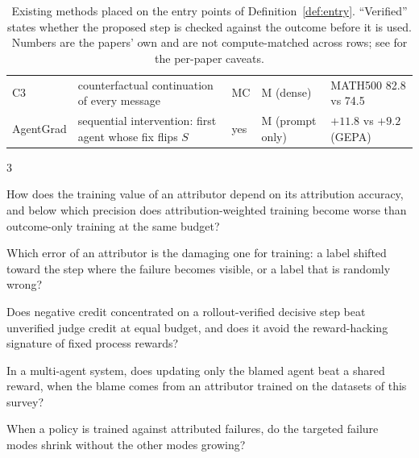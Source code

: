 \begin{table}[h]
\begin{tabularx}{\linewidth}{@{}l >{\RaggedRight\hsize=1.05\hsize}X l >{\RaggedRight\hsize=0.95\hsize}X l@{}}
C3 \cite{chen2026c3} & counterfactual continuation of every message & MC & M (dense) & MATH500 82.8 vs 74.5 \\
AgentGrad \cite{chu2026agentgrad} & sequential intervention: first agent whose fix flips $S$ & yes & M (prompt only) & $+11.8$ vs $+9.2$ (GEPA) \\\bottomrule
\end{tabularx}
\caption{Existing methods placed on the entry points of Definition~\ref{def:entry}. ``Verified'' states whether the proposed step is checked against the outcome before it is used. Numbers are the papers' own and are not compute-matched across rows; see  for the per-paper caveats.}
\label{tab:entry}
\end{table}

\begin{rqbox}{3}
\begin{description}[leftmargin=3.2em,style=sameline,font=\bfseries,itemsep=1.5pt]
\item[RQ\,3.1] How does the training value of an attributor depend on its attribution accuracy, and below which precision does attribution-weighted training become worse than outcome-only training at the same budget?
\item[RQ\,3.2] Which error of an attributor is the damaging one for training: a label shifted toward the step where the failure becomes visible, or a label that is randomly wrong?
\item[RQ\,3.3] Does negative credit concentrated on a rollout-verified decisive step beat unverified judge credit at equal budget, and does it avoid the reward-hacking signature of fixed process rewards?
\item[RQ\,3.4] In a multi-agent system, does updating only the blamed agent beat a shared reward, when the blame comes from an attributor trained on the datasets of this survey?
\item[RQ\,3.5] When a policy is trained against attributed failures, do the targeted failure modes shrink without the other modes growing?
\end{description}
\end{rqbox}

